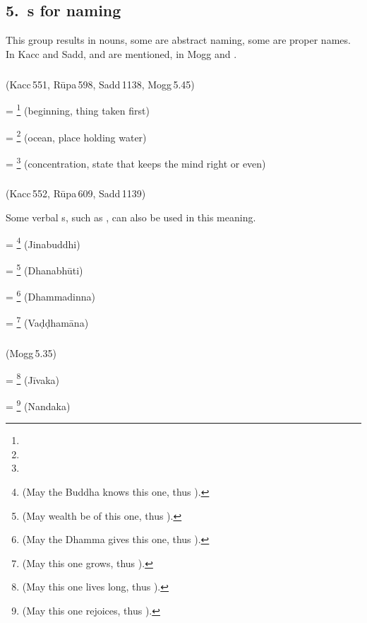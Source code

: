 \subsection*{5.\ s for naming}\label{kita:group5}

This group results in nouns, some are abstract naming, some are proper names. In Kacc and Sadd,  and  are mentioned, in Mogg  and .

\subparagraph*{} (Kacc\,551, R\=upa\,598, Sadd\,1138, Mogg\,5.45)\label{pacck5:i}

 = \footnote{} (beginning, thing taken first)\par
{} = \footnote{} (ocean, place holding water)\par
{} = \footnote{} (concentration, state that keeps the mind right or even)\par

\subparagraph*{} (Kacc\,552, R\=upa\,609, Sadd\,1139)\label{pacck5:ti}

Some verbal s, such as , can also be used in this meaning.

 = \footnote{ (May the Buddha knows this one, thus ).} (Jinabuddhi)\par
{} = \footnote{ (May wealth be of this one, thus ).} (Dhanabh\=uti)\par
{} = \footnote{ (May the Dhamma gives this one, thus ).} (Dhammadinna)\par
{} = \footnote{ (May this one grows, thus ).} (Va\d d\d dham\=ana)\par

\subparagraph*{} (Mogg\,5.35)\label{pacck5:aka}

 = \footnote{ (May this one lives long, thus ).} (J\=ivaka)\par
{} = \footnote{ (May this one rejoices, thus ).} (Nandaka)\par

